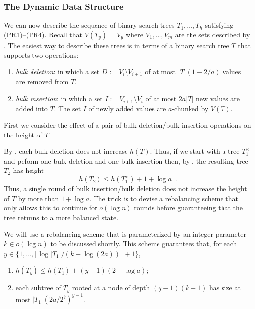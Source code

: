 \documentclass[kpfonts]{patmorin}
\newcommand{\pnote}[1]{\ \newline\noindent\fcolorbox{red}{yellow}{\begin{minipage}{\textwidth}#1\end{minipage}}}
\begin{document}
\subsubsection{The Dynamic Data Structure}

We can now describe the sequence of binary search trees $T_1,\ldots,T_h$ satisfying (PR1)--(PR4).  Recall that $V(T_y)=V_{y}$ where $V_1,\ldots,V_m$ are the sets described by .  The easiest way to describe these trees is in terms of a binary search tree $T$ that supports two operations:
\begin{enumerate}
  \item \emph{bulk deletion}: in which a set $D:=V_{i}\setminus V_{i+1}$ of at most $|T|(1-2/a)$ values are removed from $T$. 
  \item \emph{bulk insertion}: in which a set $I:=V_{i+1}\setminus V_i$ of at most $2a|T|$ new values are added into $T$.  The set $I$ of newly added values are $a$-chunked by $V(T)$.
\end{enumerate}
First we consider the effect of a pair of bulk deletion/bulk insertion operations on the height of $T$.

By , each bulk deletion does not increase $h(T)$.  Thus, if we start with a tree $T_1^\times$ and peform one bulk deletion and one bulk insertion then, 
by , the resulting tree $T_2$ has height
\[
   h(T_2) \le h(T_1^\times)+1+\log a \enspace .
\]
Thus, a single round of bulk insertion/bulk deletion does not increase the height of $T$ by more than $1+\log a$.  The trick is to devise a rebalancing scheme that only allows this to continue for $o(\log n)$ rounds before guaranteeing that the tree returns to a more balanced state.

We will use a rebalancing scheme that is parameterized by an integer parameter $k\in o(\log n)$ to be discussed shortly.  This scheme guarantees that, for each $y\in\{1,\ldots,\lceil\log|T_1|/(k-\log(2a))\rceil+1\}$, 
\begin{enumerate}[(B1)]
  \item $h(T_y)\le h(T_1) + (y-1)(2+\log a)$;
  \item each subtree of $T_y$ rooted at a node of depth $(y-1)(k+1)$ has size at most $|T_1|(2a/2^k)^{y-1}$.
\end{enumerate}
\end{document}
